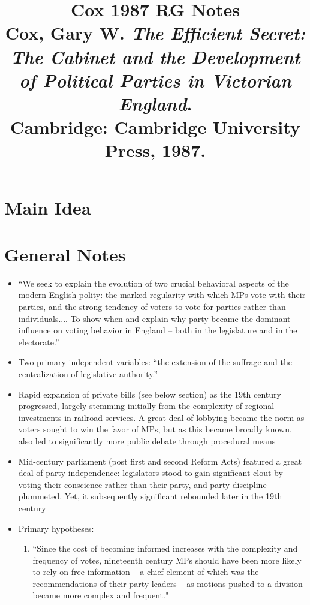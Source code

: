 \documentclass[12pt]{article}
\title{\textbf{Cox 1987 RG Notes}\\
\large Cox, Gary W. \textit{The Efficient Secret: The Cabinet and the Development of Political Parties in Victorian England}.\\
Cambridge: Cambridge University Press, 1987.}
\author{}
\date{}
\begin{document}
\maketitle

\section{Main Idea}



\section{General Notes}

\begin{itemize}[leftmargin=*, itemsep=4pt]
    \item ``We seek to explain the evolution of two crucial behavioral aspects of the modern English polity: the marked regularity with which MPs vote with their parties, and the strong tendency of voters to vote for parties rather than individuals.... To show when and explain why party became the dominant influence on voting behavior in England -- both in the legislature and in the electorate.''
    \item Two primary independent variables: ``the extension of the suffrage and the centralization of legislative authority.''
    \item Rapid expansion of private bills (see below section) as the 19th century progressed, largely stemming initially from the complexity of regional investments in railroad services. A great deal of lobbying became the norm as voters sought to win the favor of MPs, but as this became broadly known, also led to significantly more public debate through procedural means
    \item Mid-century parliament (post first and second Reform Acts) featured a great deal of party independence: legislators stood to gain significant clout by voting their conscience rather than their party, and party discipline plummeted. Yet, it subsequently significant rebounded later in the 19th century
    \item Primary hypotheses:
    \begin{enumerate}
        \item ``Since the cost of becoming informed increases with the complexity and frequency of votes, nineteenth century MPs should have been more likely to rely on free information -- a chief element of which was the recommendations of their party leaders -- as motions pushed to a division became more complex and frequent."

\end{enumerate}
\end{itemize}
\end{document}

